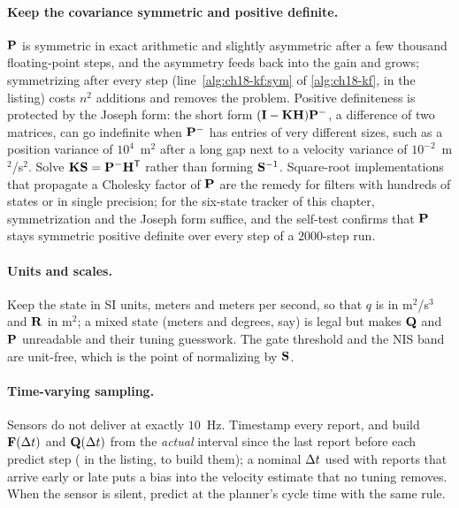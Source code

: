 \paragraph{Keep the covariance symmetric and positive definite.}
$\mathbf{P}$ is symmetric in exact arithmetic and slightly asymmetric after a
few thousand floating-point steps, and the asymmetry feeds back into the
gain and grows; symmetrizing after every step (line~\ref{alg:ch18-kf:sym} of
\cref{alg:ch18-kf},  in the listing) costs $n^2$ additions
and removes the problem. Positive definiteness is protected by the Joseph
form: the short form $(\mathbf{I}-\mathbf{K}\mathbf{H})\mathbf{P}^-$, a difference of two
matrices, can go indefinite when $\mathbf{P}^-$ has entries of very different
sizes, such as a position variance of $10^4$~m$^2$ after a long gap next to a
velocity variance of $10^{-2}$~m$^2$/s$^2$. Solve
$\mathbf{K}\mathbf{S}=\mathbf{P}^-\mathbf{H}^{\mathsf{T}}$ rather than forming $\mathbf{S}^{-1}$.
Square-root implementations that propagate a Cholesky factor of $\mathbf{P}$
\cite{maybeck1979stochastic} are the remedy for filters with hundreds of
states or in single precision; for the six-state tracker of this chapter,
symmetrization and the Joseph form suffice, and the self-test confirms that
$\mathbf{P}$ stays symmetric positive definite over every step of a
$2000$-step run.

\paragraph{Units and scales.}
Keep the state in SI units, meters and meters per second, so that $q$ is in
m$^2$/s$^3$ and $\mathbf{R}$ in m$^2$; a mixed state (meters and degrees, say)
is legal but makes $\mathbf{Q}$ and $\mathbf{P}$ unreadable and their tuning
guesswork. The gate threshold and the NIS band are unit-free, which is the
point of normalizing by $\mathbf{S}$.

\paragraph{Time-varying sampling.}
Sensors do not deliver at exactly $10$~Hz. Timestamp every report, and build
$\mathbf{F}(\Delta t)$ and $\mathbf{Q}(\Delta t)$ from the \emph{actual} interval since the
last report before each predict step ( in the
listing,  to build them); a nominal $\Delta t$ used with reports
that arrive early or late puts a bias into the velocity estimate that no
tuning removes. When the sensor is silent, predict at the planner's cycle
time with the same rule.

